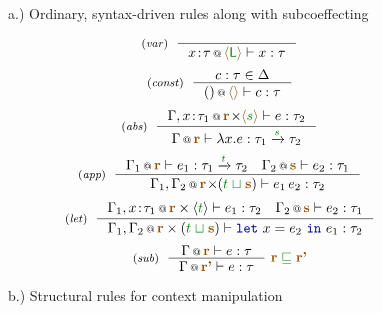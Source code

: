 
\begin{figure}[t]
a.) Ordinary, syntax-driven rules along with subcoeffecting

\begin{equation*}
\tyrule{var}{}
  {\coctx{x \!:\! \tau}{\alift{\cclrd{\ident L}}} \vdash x : \tau}
\end{equation*}
\begin{equation*}
\tyrule{const}
  {c:\tau \in \Delta}
  {\coctx{()}{\alift{}} \vdash c : \tau}
\end{equation*}
\begin{equation*}
\tyrule{abs}
  {\coctx{\Gamma, x \!:\! \tau_1}{\aclrd{\textbf{r}} \cons \alift{\cclrd{s}}} \vdash e : \tau_2}
  {\coctx{\Gamma}{\aclrd{\textbf{r}}} \vdash \lambda x . e : \tau_1 \xrightarrow{\cclrd{s}} \tau_2}
\end{equation*}
\begin{equation*}
\tyrule{app}
  { \coctx{\Gamma_1}{\aclrd{\textbf{r}}} \vdash e_1 : \tau_1 \xrightarrow{\cclrd{t}} \tau_2 \quad
    \coctx{\Gamma_2}{\aclrd{\textbf{s}}} \vdash e_2 : \tau_1}
  { \coctx{\Gamma_1, \Gamma_2}{\aclrd{\textbf{r}} \cons (\cclrd{t} \;\cclrd{\sqcup}\; \aclrd{\textbf{s}})} \vdash e_1 \, e_2 : \tau_2}
\end{equation*}
\begin{equation*}
\tyrule{let}
  { \coctx{\Gamma_1, x \!:\! \tau_1}{\aclrd{\textbf{r}} \times \langle{\cclrd{t}}\rangle} \vdash e_1 : \tau_2 \quad
    \coctx{\Gamma_2}{\aclrd{\textbf{s}}} \vdash e_2 : \tau_1}
  {\coctx{\Gamma_1, \Gamma_2}{\aclrd{\textbf{r}} \times (\cclrd{t} \;\cclrd{\sqcup}\; \aclrd{\textbf{s}})} \vdash \kvd{let}~x=e_2~\kvd{in}~e_1 : \tau_2}
\end{equation*}
\begin{equation*}
\tyrule{sub}
  {\coctx{\Gamma}{\aclrd{\textbf{r}}} \vdash e : \tau}
  {\coctx{\Gamma}{\aclrd{\textbf{r'}}} \vdash e : \tau}~\aclrd{\textbf{r}} \;\cclrd{\sqsubseteq}\; \aclrd{\textbf{r'}}
\end{equation*}
\vspace{1em}

b.) Structural rules for context manipulation


\end{figure}
